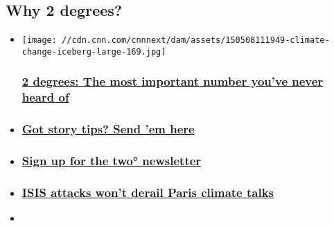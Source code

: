 \hypertarget{why-2-degrees-}{%
\subsection{Why 2 degrees?~}\label{why-2-degrees-}}

\begin{itemize}
\item
  \href{/2015/04/21/opinions/sutter-climate-two-degrees/index.html}{}

  \texttt{[image: //cdn.cnn.com/cnnnext/dam/assets/150508111949-climate-change-iceberg-large-169.jpg]}

  \hypertarget{2-degrees-the-most-important-number-youve-never-heard-of}{%
  \subsubsection{\texorpdfstring{\href{/2015/04/21/opinions/sutter-climate-two-degrees/index.html}{2
  degrees: The most important number you've never heard
  of}}{2 degrees: The most important number you've never heard of}}\label{2-degrees-the-most-important-number-youve-never-heard-of}}
\item
  \hypertarget{got-story-tips-send-em-here}{%
  \subsubsection{\texorpdfstring{\href{mailto:climate@cnn.com}{Got story
  tips? Send 'em
  here}}{Got story tips? Send 'em here}}\label{got-story-tips-send-em-here}}
\item
  \hypertarget{sign-up-for-the-two-newsletter}{%
  \subsubsection{\texorpdfstring{\href{http://tinyletter.com/jdsutter}{Sign
  up for the two°
  newsletter}}{Sign up for the two° newsletter}}\label{sign-up-for-the-two-newsletter}}
\item
  \hypertarget{isis-attacks-wont-derail-paris-climate-talks}{%
  \subsubsection{\texorpdfstring{\href{/2015/11/19/opinions/sutter-climate-talks-paris-attacks/index.html}{ISIS
  attacks won't derail Paris climate
  talks}}{ISIS attacks won't derail Paris climate talks}}\label{isis-attacks-wont-derail-paris-climate-talks}}
\item
  \hypertarget{why-more-women-need-seats-at-the-table}{%
}
\end{itemize}
